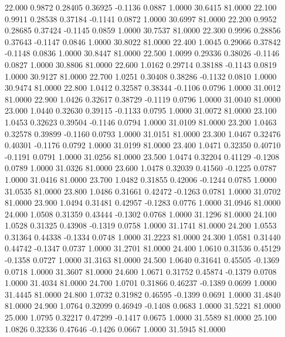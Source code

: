   22.000   0.9872   0.28405   0.36925  -0.1136   0.0887   1.0000  30.6415  81.0000
  22.100   0.9911   0.28538   0.37184  -0.1141   0.0872   1.0000  30.6997  81.0000
  22.200   0.9952   0.28685   0.37424  -0.1145   0.0859   1.0000  30.7537  81.0000
  22.300   0.9996   0.28856   0.37643  -0.1147   0.0846   1.0000  30.8022  81.0000
  22.400   1.0045   0.29066   0.37842  -0.1148   0.0836   1.0000  30.8447  81.0000
  22.500   1.0099   0.29336   0.38026  -0.1146   0.0827   1.0000  30.8806  81.0000
  22.600   1.0162   0.29714   0.38188  -0.1143   0.0819   1.0000  30.9127  81.0000
  22.700   1.0251   0.30408   0.38286  -0.1132   0.0810   1.0000  30.9474  81.0000
  22.800   1.0412   0.32587   0.38344  -0.1106   0.0796   1.0000  31.0012  81.0000
  22.900   1.0426   0.32617   0.38729  -0.1119   0.0796   1.0000  31.0040  81.0000
  23.000   1.0440   0.32630   0.39115  -0.1133   0.0795   1.0000  31.0072  81.0000
  23.100   1.0453   0.32623   0.39504  -0.1146   0.0794   1.0000  31.0109  81.0000
  23.200   1.0463   0.32578   0.39899  -0.1160   0.0793   1.0000  31.0151  81.0000
  23.300   1.0467   0.32476   0.40301  -0.1176   0.0792   1.0000  31.0199  81.0000
  23.400   1.0471   0.32350   0.40710  -0.1191   0.0791   1.0000  31.0256  81.0000
  23.500   1.0474   0.32204   0.41129  -0.1208   0.0789   1.0000  31.0326  81.0000
  23.600   1.0478   0.32039   0.41560  -0.1225   0.0787   1.0000  31.0416  81.0000
  23.700   1.0482   0.31855   0.42006  -0.1244   0.0785   1.0000  31.0535  81.0000
  23.800   1.0486   0.31661   0.42472  -0.1263   0.0781   1.0000  31.0702  81.0000
  23.900   1.0494   0.31481   0.42957  -0.1283   0.0776   1.0000  31.0946  81.0000
  24.000   1.0508   0.31359   0.43444  -0.1302   0.0768   1.0000  31.1296  81.0000
  24.100   1.0528   0.31325   0.43908  -0.1319   0.0758   1.0000  31.1741  81.0000
  24.200   1.0553   0.31364   0.44338  -0.1334   0.0748   1.0000  31.2223  81.0000
  24.300   1.0581   0.31440   0.44742  -0.1347   0.0737   1.0000  31.2701  81.0000
  24.400   1.0610   0.31536   0.45129  -0.1358   0.0727   1.0000  31.3163  81.0000
  24.500   1.0640   0.31641   0.45505  -0.1369   0.0718   1.0000  31.3607  81.0000
  24.600   1.0671   0.31752   0.45874  -0.1379   0.0708   1.0000  31.4034  81.0000
  24.700   1.0701   0.31866   0.46237  -0.1389   0.0699   1.0000  31.4445  81.0000
  24.800   1.0732   0.31982   0.46595  -0.1399   0.0691   1.0000  31.4840  81.0000
  24.900   1.0764   0.32099   0.46949  -0.1408   0.0683   1.0000  31.5221  81.0000
  25.000   1.0795   0.32217   0.47299  -0.1417   0.0675   1.0000  31.5589  81.0000
  25.100   1.0826   0.32336   0.47646  -0.1426   0.0667   1.0000  31.5945  81.0000
